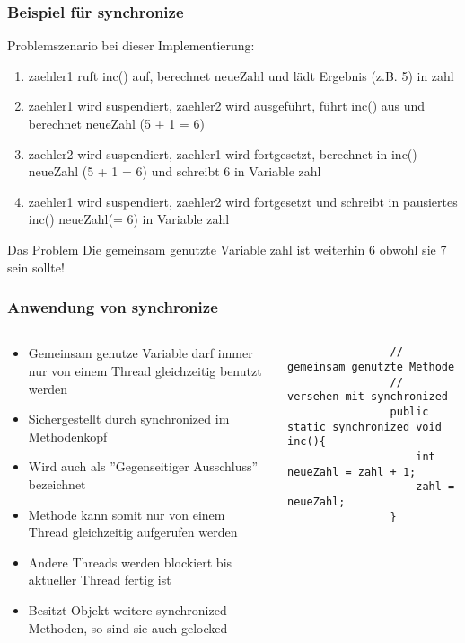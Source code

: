 \begin{frame}[fragile]
\frametitle{Beispiel für synchronize}
	\begin{block}{Problemszenario bei dieser Implementierung:}
	\small
	\begin{enumerate}
	  \item zaehler1 ruft inc() auf, berechnet neueZahl und lädt Ergebnis (z.B.
	  5) in zahl
	  \item zaehler1 wird suspendiert, zaehler2 wird ausgeführt, führt inc() aus
	  und berechnet neueZahl (5 + 1 = 6)
	  \item zaehler2 wird suspendiert, zaehler1 wird fortgesetzt, berechnet in inc()
	  neueZahl (5 + 1 = 6) und schreibt 6 in Variable zahl
	  \item zaehler1 wird suspendiert, zaehler2 wird fortgesetzt und schreibt in
	  pausiertes inc() neueZahl(= 6) in Variable zahl
	\end{enumerate}
	\end{block}
	\begin{alertblock}{Das Problem}
	\small
	Die gemeinsam genutzte Variable zahl ist weiterhin 6 obwohl sie 7
	sein sollte!
	\end{alertblock}
\end{frame}

\begin{frame}[fragile]
	\frametitle{Anwendung von synchronize}
	\begin{columns}
		\begin{column}{0.7\textwidth}
			\small
			\begin{itemize}
			  \item Gemeinsam genutze Variable darf immer nur von einem Thread
			  gleichzeitig benutzt werden
			  \item Sichergestellt durch synchronized im Methodenkopf
			  \item Wird auch als ''Gegenseitiger Ausschluss'' bezeichnet
			  \item Methode kann somit nur von einem Thread gleichzeitig aufgerufen
			  werden
			  \item Andere Threads werden blockiert bis aktueller Thread fertig ist
			  \item Besitzt Objekt weitere synchronized-Methoden, so sind sie auch
			  gelocked
			\end{itemize}
			\normalsize
		\end{column}
		\begin{column}{0.3\textwidth}
			\begin{lstlisting}
				// gemeinsam genutzte Methode
				// versehen mit synchronized
				public static synchronized void inc(){
					int neueZahl = zahl + 1;
				    zahl = neueZahl;
				}
			\end{lstlisting}
		\end{column}
	\end{columns}
\end{frame}

